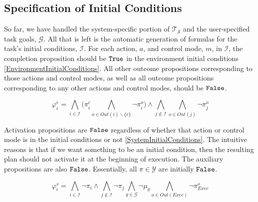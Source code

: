 
\subsection{Specification of Initial Conditions}

So far, we have handled the system-specific portion of $\mathcal{T_S}$ and the user-specified task goals, $\mathcal{G}$.
All that is left is the automatic generation of formulas for the task's initial conditions, $\mathcal{I}$.
For each action, $a$, and control mode, $m$, in $\mathcal{I}$, the completion proposition should be $\mathtt{True}$ in the environment initial conditions \eqref{EnvironmentInitialConditions}.
All other outcome propositions corresponding to those actions and control modes, as well as all outcome propositions corresponding to any other actions and control modes, should be $\mathtt{False}$.

\begin{equation}\label{EnvironmentInitialConditions}
	\varphi_i^e = \bigwedge \limits_{i \in \mathcal{I}} \Big( \pi_i^c \bigwedge \limits_{o \in Out(i)\backslash \{c\}} \lnot \pi_i^o \Big) \wedge \bigwedge \limits_{j \not\in \mathcal{I}} \bigwedge \limits_{o \in Out(j)} \lnot \pi_j^o
\end{equation}

Activation propositions are $\mathtt{False}$ regardless of whether that action or control mode is in the initial conditions or not \eqref{SystemInitialConditions}.
The intuitive reasons is that if we want something to be an initial condition, then the resulting plan should not activate it at the beginning of execution.
The auxiliary propositions are also $\mathtt{False}$.
Essentially, all $\pi \in \mathcal{Y}$ are initially $\mathtt{False}$.

\begin{equation}\label{SystemInitialConditions}
	\varphi_i^s = \bigwedge \limits_{i \in \mathcal{I}} \lnot \pi_i \wedge \bigwedge \limits_{j \not \in \mathcal{I}} \lnot \pi_j \bigwedge \limits_{g \in \mathcal{G}} \lnot \mu_g \bigwedge \limits_{o \in Out(Exec)} \lnot \pi_{Exec}^{o}
\end{equation}


